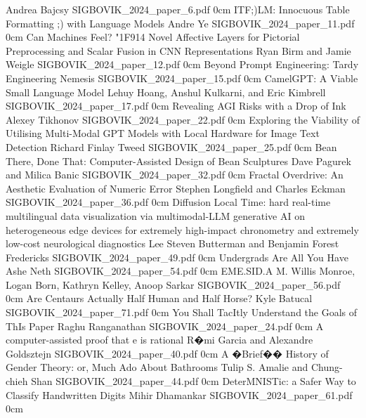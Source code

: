 	{Andrea Bajcsy}
	{}
	{SIGBOVIK_2024_paper_6.pdf}
	{0cm}
	{}
\addpaper
	{ITF;)LM: Innocuous Table Formatting ;) with Language Models}
	{Andre Ye}
	{}
	{SIGBOVIK_2024_paper_11.pdf}
	{0cm}
	{}
\addpaper
	{Can Machines Feel? \char"1F914 Novel Affective Layers for Pictorial Preprocessing and Scalar Fusion in CNN Representations}
	{Ryan Birm and Jamie Weigle}
	{}
	{SIGBOVIK_2024_paper_12.pdf}
	{0cm}
	{}
\addpaper
	{Beyond Prompt Engineering: Tardy Engineering}
	{Nemesis }
	{}
	{SIGBOVIK_2024_paper_15.pdf}
	{0cm}
	{}
\addpaper
	{CamelGPT: A Viable Small Language Model}
	{Lehuy Hoang, Anshul Kulkarni, and Eric Kimbrell}
	{}
	{SIGBOVIK_2024_paper_17.pdf}
	{0cm}
	{}
\addpaper
	{Revealing AGI Risks with a Drop of Ink}
	{Alexey Tikhonov}
	{}
	{SIGBOVIK_2024_paper_22.pdf}
	{0cm}
	{}
\addpaper
	{Exploring the Viability of Utilising Multi-Modal GPT Models with Local Hardware for Image Text Detection}
	{Richard Finlay Tweed}
	{}
	{SIGBOVIK_2024_paper_25.pdf}
	{0cm}
	{}
\addpaper
	{Bean There, Done That: Computer-Assisted Design of Bean Sculptures}
	{Dave Pagurek and Milica Banic}
	{}
	{SIGBOVIK_2024_paper_32.pdf}
	{0cm}
	{}
\addpaper
	{Fractal Overdrive: An Aesthetic Evaluation of Numeric Error}
	{Stephen Longfield and Charles Eckman}
	{}
	{SIGBOVIK_2024_paper_36.pdf}
	{0cm}
	{}
\addpaper
	{Diffusion Local Time: hard real-time multilingual data visualization via multimodal-LLM generative AI on heterogeneous edge devices for extremely high-impact chronometry and extremely low-cost neurological diagnostics}
	{Lee Steven Butterman and Benjamin Forest Fredericks}
	{}
	{SIGBOVIK_2024_paper_49.pdf}
	{0cm}
	{}
\addpaper
	{Undergrads Are All You Have}
	{Ashe Neth}
	{}
	{SIGBOVIK_2024_paper_54.pdf}
	{0cm}
	{}
\addpaper
	{EME.SID.A}
	{M. Willis Monroe, Logan Born, Kathryn Kelley, Anoop Sarkar}
	{}
	{SIGBOVIK_2024_paper_56.pdf}
	{0cm}
	{}
\addpaper
	{Are Centaurs Actually Half Human and Half Horse?}
	{Kyle Batucal}
	{}
	{SIGBOVIK_2024_paper_71.pdf}
	{0cm}
	{}
\addpaper
	{You Shall TacItly Understand the Goals of ThIs Paper}
	{Raghu Ranganathan}
	{}
	{SIGBOVIK_2024_paper_24.pdf}
	{0cm}
	{}
\addpaper
	{A computer-assisted proof that e is rational}
	{R�mi Garcia and Alexandre Goldsztejn}
	{}
	{SIGBOVIK_2024_paper_40.pdf}
	{0cm}
	{}
\addpaper
	{A �Brief�� History of Gender Theory: or, Much Ado About Bathrooms}
	{Tulip S. Amalie and Chung-chieh Shan}
	{}
	{SIGBOVIK_2024_paper_44.pdf}
	{0cm}
	{}
\addpaper
	{DeterMNISTic: a Safer Way to Classify Handwritten Digits}
	{Mihir Dhamankar}
	{}
	{SIGBOVIK_2024_paper_61.pdf}
	{0cm}
	{}
\addpaper
